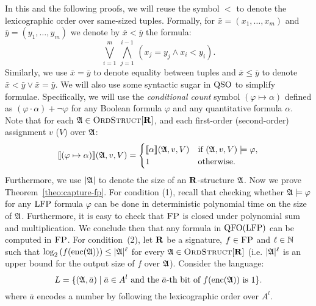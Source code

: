 In this and the following proofs, we will reuse the symbol $<$ to denote the lexicographic order over same-sized tuples. 
Formally, for $\bar{x} = (x_1,\ldots,x_m)$ and $\bar{y} = (y_1,\ldots,y_m)$ we denote by $\bar{x} < \bar{y}$ the formula:
$$
\bigvee_{i = 1}^m \, \bigwedge_{j = 1}^{i-1} \, (x_j = y_j \wedge x_i < y_i).
$$
Similarly, we use $\bar{x} = \bar{y}$ to denote equality between tuples and $\bar{x} \leq \bar{y}$  to denote $\bar{x} < \bar{y} \vee \bar{x} = \bar{y}$.
We will also use some syntactic sugar in ${\rm QSO}$ to simplify formulae. 
Specifically, we will use the {\em conditional count} symbol $(\varphi \mapsto \alpha)$ defined as $ (\varphi\cdot\alpha) + \neg\varphi$ for any Boolean formula $\varphi$ and any quantitative formula $\alpha$. 
Note that for each $\mathfrak{A} \in \text{\sc OrdStruct}[\mathbf{R}]$, and each first-order (second-order) assignment $v$ ($V$) over $\mathfrak{A}$:
\[
{\llbracket{}{(\varphi \mapsto \alpha)}\rrbracket}(\mathfrak{A},v,V) = 
\begin{cases}
{\llbracket{}{\alpha}\rrbracket}(\mathfrak{A},v,V) &\text{if } (\mathfrak{A},v,V)\models\varphi,\\
1 &\text{otherwise}.
\end{cases}
\]
Furthermore, we use $\vert \mathfrak{A} \vert$ to denote the size of an $\mathbf{R}$-structure $\mathfrak{A}$.
Now we prove Theorem~\ref{theo:capture-fp}. 
For condition (1), recall that checking whether $\mathfrak{A}\models\varphi$ for any ${\rm LFP}$ formula $\varphi$ can be done in deterministic polynomial time on the size of $\mathfrak{A}$\cite{I83}. 
Furthermore, it is easy to check that $\text{\sc FP}$ is closed under polynomial sum and multiplication. 
We conclude then that any formula in ${\rm QFO}({\rm LFP})$ can be computed in $\text{\sc FP}$.	
For condition~(2), let $\mathbf{R}$ be a signature, $f\in \text{\sc FP}$
and $\ell\in\mathbb{N}$ such that $\log_2\left(f({\rm enc}(\mathfrak{A})) \right) \leq \vert \mathfrak{A} \vert^\ell$ for every $\mathfrak{A}\in\text{\sc OrdStruct}[\mathbf{R}]$ (i.e. $\vert \mathfrak{A} \vert^\ell$ is an upper bound for the output size of $f$ over $\mathfrak{A}$).
Consider the language:
\[
L = \{(\mathfrak{A},\bar{a})\mid \bar{a} \in A^l \text{ and the } \bar{a}\text{-th bit of }f({\rm enc}(\mathfrak{A}))\text{ is 1}\}.
\]
where $\bar{a}$ encodes a number by following the lexicographic order over $A^l$.
